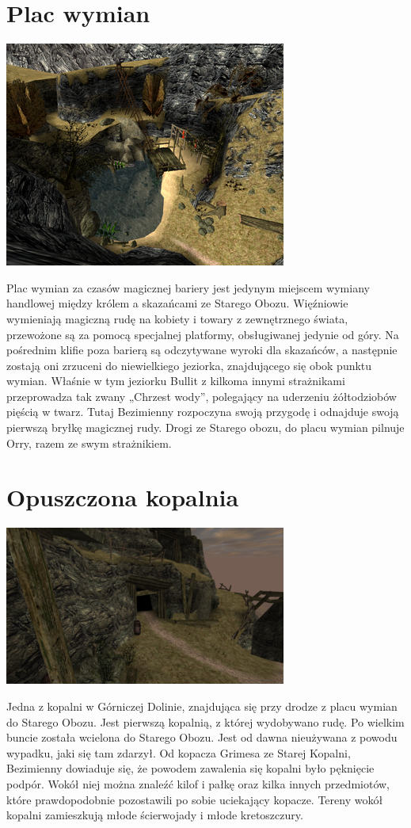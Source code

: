 \documentclass[11pt,polish, openany]{book}
\begin{document}
\section{Plac wymian}
\begin{center}
 \includegraphics[scale=0.8]{placwymian.png}
\end{center}
Plac wymian za czasów magicznej bariery jest jedynym miejscem wymiany handlowej między królem a skazańcami ze Starego Obozu. Więźniowie wymieniają magiczną rudę na kobiety i towary z zewnętrznego świata, przewożone są za pomocą specjalnej platformy, obsługiwanej jedynie od góry. Na pośrednim klifie poza barierą są odczytywane wyroki dla skazańców, a następnie zostają oni zrzuceni do niewielkiego jeziorka, znajdującego się obok punktu wymian. Właśnie w tym jeziorku Bullit z kilkoma innymi strażnikami przeprowadza tak zwany „Chrzest wody”, polegający na uderzeniu żółtodziobów pięścią w twarz. Tutaj Bezimienny rozpoczyna swoją przygodę i odnajduje swoją pierwszą bryłkę magicznej rudy. Drogi ze Starego obozu, do placu wymian pilnuje Orry, razem ze swym strażnikiem.
\section{Opuszczona kopalnia}
\begin{center}
 \includegraphics[scale=1.0]{opuszczonakopalnia.png}
\end{center}
 Jedna z kopalni w Górniczej Dolinie, znajdująca się przy drodze z placu wymian do Starego Obozu. Jest pierwszą kopalnią, z której wydobywano rudę. Po wielkim buncie została wcielona do Starego Obozu. Jest od dawna nieużywana z powodu wypadku, jaki się tam zdarzył. Od kopacza Grimesa ze Starej Kopalni, Bezimienny dowiaduje się, że powodem zawalenia się kopalni było pęknięcie podpór. Wokół niej można znaleźć kilof i pałkę oraz kilka innych przedmiotów, które prawdopodobnie pozostawili po sobie uciekający kopacze. Tereny wokół kopalni zamieszkują młode ścierwojady i młode kretoszczury.
\end{document}
